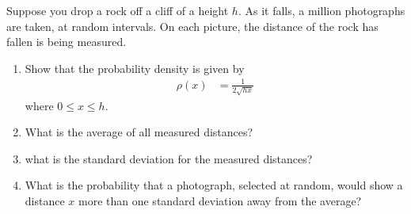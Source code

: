 \documentclass[fleqn, a4paper, 11pt, oneside]{amsart}
\theoremstyle{definition}
\theoremstyle{theorem}
\begin{document}
\begin{question}
	Suppose you drop a rock off a cliff of a height $h$.
	As it falls, a million photographs are taken, at random intervals.
	On each picture, the distance of the rock has fallen is being measured.
	\begin{enumerate}
		\item
			Show that the probability density is given by
			\begin{align*}
				\rho(x) & = \frac{1}{2 \sqrt{h x}}
			\end{align*}
			where $0 \le x \le h$.
		\item
			What is the average of all measured distances?
		\item
			what is the standard deviation for the measured distances?
		\item
			What is the probability that a photograph, selected at random, would show a distance $x$ more than one standard deviation away from the average?
	\end{enumerate}
\end{question}
\end{document}
